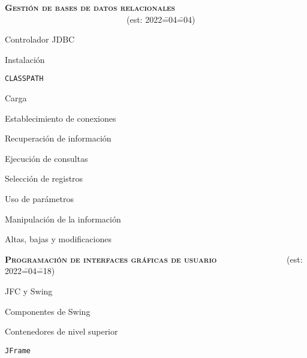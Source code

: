 \begin{longenum}
\begin{longenum}
\begin{longenum}
\begin{longenum}
            \end{longenum}
        \end{longenum}
    \end{longenum}
    \item \textbf{\textsc{Gestión de bases de datos relacionales}} \ \ \ \ \ \ \ \ \ \ \ \ \ \ \ \ \ \ \ \ \ \ \ \ \ \ \ \ \ (est: 2022\==04\==04)
    \begin{longenum}
        \item Controlador JDBC
        \begin{longenum}
            \item Instalación
            \item \texttt{CLASSPATH}
            \item Carga
        \end{longenum}
        \item Establecimiento de conexiones
        \item Recuperación de información
        \begin{longenum}
            \item Ejecución de consultas
            \item Selección de registros
            \item Uso de parámetros
        \end{longenum}
        \item Manipulación de la información
        \begin{longenum}
            \item Altas, bajas y modificaciones
        \end{longenum}
    \end{longenum}
    \item \textbf{\textsc{Programación de interfaces gráficas de usuario}} \ \ \ \ \ \ \ \ \ \ \ \ \ \ \ \ (est: 2022\==04\==18)
    \begin{longenum}
        \item JFC y Swing
        \item Componentes de Swing
        \item Contenedores de nivel superior
        \begin{longenum}
            \item \texttt{JFrame}

\end{longenum}
\end{longenum}
\end{longenum}

